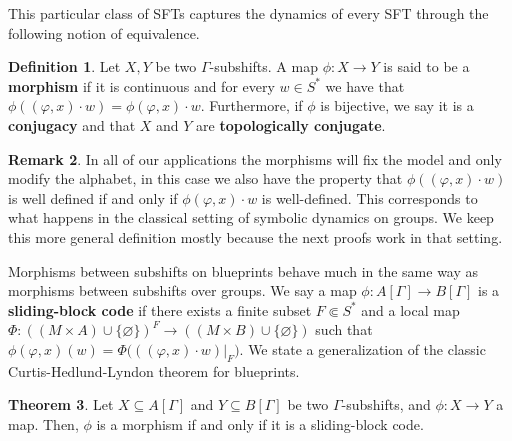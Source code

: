 \documentclass{article}
\theoremstyle{definition}
\newtheorem{theorem}{Theorem}[section] %
\newtheorem{remark}[theorem]{Remark}
\newtheorem{defn}[theorem]{Definition} %
\theoremstyle{definition}
\newcommand{\define}[1]{\textbf{#1}}
\begin{document}
This particular class of SFTs captures the dynamics of every SFT through the following notion of equivalence.

\begin{defn}\label{def:morphism}
    Let $X,Y$ be two $\Gamma$-subshifts. A map $\phi\colon X\to Y$ is said to be a \define{morphism} if it is continuous and for every $w \in S^*$ we have that $\phi((\varphi,x)\cdot w) = \phi(\varphi,x)\cdot w$. Furthermore, if $\phi$ is bijective, we say it is a \define{conjugacy} and that $X$ and $Y$ are \define{topologically conjugate}.
\end{defn}

\begin{remark}
    In all of our applications the morphisms will fix the model and only modify the alphabet, in this case we also have the property that $\phi((\varphi,x)\cdot w)$ is well defined if and only if $\phi(\varphi,x)\cdot w$ is well-defined. This corresponds to what happens in the classical setting of symbolic dynamics on groups. We keep this more general definition mostly because the next proofs work in that setting.
\end{remark}

Morphisms between subshifts on blueprints behave much in the same way as morphisms between subshifts over groups. We say a map $\phi\colon A[\Gamma]\to B[\Gamma]$ is a \define{sliding-block code} if there exists a finite subset $F\Subset S^*$ and a local map $\Phi\colon ((M\times A)\cup \{\varnothing\})^{F}\to((M\times B)\cup \{\varnothing\})$ such that $\phi(\varphi, x)(w) = \Phi\bigl(((\varphi, x)\cdot w)|_{F}\bigr)$. We state a generalization of the classic Curtis-Hedlund-Lyndon theorem for blueprints.

\begin{theorem}
\label{thm:CHL}
    Let $X\subseteq A[\Gamma]$ and $Y\subseteq B[\Gamma]$ be two $\Gamma$-subshifts, and $\phi:X\to Y$ a map. Then, $\phi$ is a morphism if and only if it is a sliding-block code.
\end{theorem}
\end{document}

